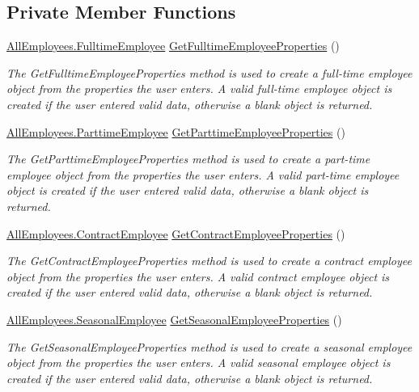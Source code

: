 \subsection*{Private Member Functions}
\begin{DoxyCompactItemize}
\item 
\hyperlink{class_all_employees_1_1_fulltime_employee}{All\+Employees.\+Fulltime\+Employee} \hyperlink{class_the_company_1_1_container_a06dd9fa578f03d192bb0782b19b11c22}{Get\+Fulltime\+Employee\+Properties} ()
\begin{DoxyCompactList}\small\item\em The Get\+Fulltime\+Employee\+Properties method is used to create a full-\/time employee object from the properties the user enters. A valid full-\/time employee object is created if the user entered valid data, otherwise a blank object is returned. \end{DoxyCompactList}\item 
\hyperlink{class_all_employees_1_1_parttime_employee}{All\+Employees.\+Parttime\+Employee} \hyperlink{class_the_company_1_1_container_abf8f2eb5f6f39ff539f0f051979a427a}{Get\+Parttime\+Employee\+Properties} ()
\begin{DoxyCompactList}\small\item\em The Get\+Parttime\+Employee\+Properties method is used to create a part-\/time employee object from the properties the user enters. A valid part-\/time employee object is created if the user entered valid data, otherwise a blank object is returned. \end{DoxyCompactList}\item 
\hyperlink{class_all_employees_1_1_contract_employee}{All\+Employees.\+Contract\+Employee} \hyperlink{class_the_company_1_1_container_aff37e43af89a37628263cd78b80a60a5}{Get\+Contract\+Employee\+Properties} ()
\begin{DoxyCompactList}\small\item\em The Get\+Contract\+Employee\+Properties method is used to create a contract employee object from the properties the user enters. A valid contract employee object is created if the user entered valid data, otherwise a blank object is returned. \end{DoxyCompactList}\item 
\hyperlink{class_all_employees_1_1_seasonal_employee}{All\+Employees.\+Seasonal\+Employee} \hyperlink{class_the_company_1_1_container_aec76c3159677efddcb47b08ce8404478}{Get\+Seasonal\+Employee\+Properties} ()
\begin{DoxyCompactList}\small\item\em The Get\+Seasonal\+Employee\+Properties method is used to create a seasonal employee object from the properties the user enters. A valid seasonal employee object is created if the user entered valid data, otherwise a blank object is returned. \end{DoxyCompactList}\item 

\end{DoxyCompactItemize}
